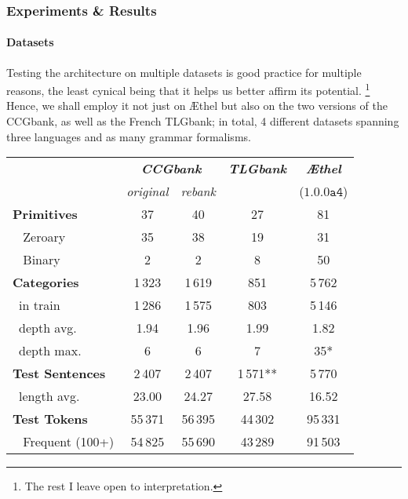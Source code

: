 \subsubsection{Experiments \& Results}
\paragraph{Datasets}
Testing the architecture on multiple datasets is good practice for multiple reasons, the least cynical being that it helps us better affirm its potential.%
	\footnote{The rest I leave open to interpretation.}
Hence, we shall employ it not just on \AE thel but also on the two versions of the CCGbank, as well as the French TLGbank; in total, 4 different datasets spanning three languages and as many grammar formalisms.

\begin{table}
    \centering
    \small{
    \begin{tabular}{@{}l@{\qquad}c@{\quad}c@{\qquad}c@{\qquad}c@{}}
        & \multicolumn{2}{c}{\textbf{\textit{CCGbank}}} 
        & \textbf{\textit{TLGbank}}
        & \textbf{\textit{\AE thel}}\\ 
        & \textit{original} & \textit{rebank} & & ($\mathtt{1.0.0a4}$)\\
        \toprule
        \textbf{Primitives}     & 37        & 40        & 27        & 81\\
        ~ Zeroary           & 35        & 38        & 19        & 31\\ 
        ~ Binary            & 2         & 2         & 8         & 50\\
        \midrule
        \textbf{Categories}     & 1\,323      & 1\,619      & 851      & 5\,762\\
        ~{in train}         & 1\,286      & 1\,575      & 803      & 5\,146\\
        ~{depth avg.}       & 1.94      & 1.96      & 1.99     &   1.82\\
        ~{depth max.}       & 6         & 6         & 7        & 35*\\ 
        \midrule
        \textbf{Test Sentences} & 2\,407      & 2\,407      & 1\,571**    & 5\,770 \\
        ~{length avg.}      & 23.00     & 24.27     & 27.58    &  16.52\\
        \midrule
        \textbf{Test Tokens}    & 55\,371     & 56\,395     & 44\,302     & 95\,331\\
        ~ Frequent {(100+)}   & 54\,825     & 55\,690     & 43\,289     & 91\,503\\

\end{tabular}}
\end{table}
